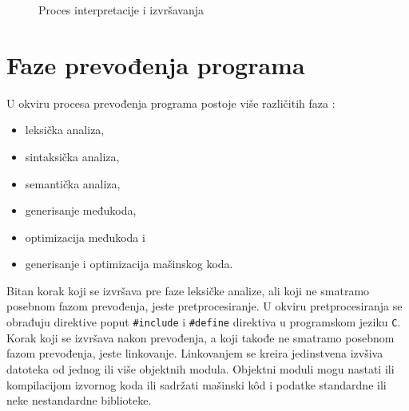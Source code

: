 \documentclass[12pt,oneside]{memoir}
\begin{document}
\begin{figure}
\centering

\caption{Proces interpretacije i izvršavanja}
\label{tikz:interpretacija}
\end{figure}


\section{Faze prevođenja programa}

U okviru procesa prevođenja programa postoje više različitih faza \cite{dragon_book}: 
\begin{itemize}
 \item leksička analiza, 
\item sintaksička analiza, 
\item semantička analiza,
\item generisanje međukoda,
\item optimizacija međukoda i 
\item generisanje i optimizacija mašinskog koda. 
\end{itemize}
Bitan korak koji se izvršava pre faze leksičke analize, ali koji ne smatramo posebnom fazom prevođenja, jeste pretprocesiranje. U okviru pretprocesiranja se obrađuju direktive poput \texttt{\#include} i \texttt{\#define} direktiva u programskom jeziku \texttt{C}. Korak koji se izvršava nakon prevođenja, a koji takođe ne smatramo posebnom fazom prevođenja, jeste linkovanje. Linkovanjem se kreira jedinstvena izvšiva datoteka od jednog ili više objektnih modula. Objektni moduli mogu nastati ili kompilacijom izvornog koda ili sadržati mašinski k\^od i podatke standardne ili neke nestandardne biblioteke.
\end{document}
